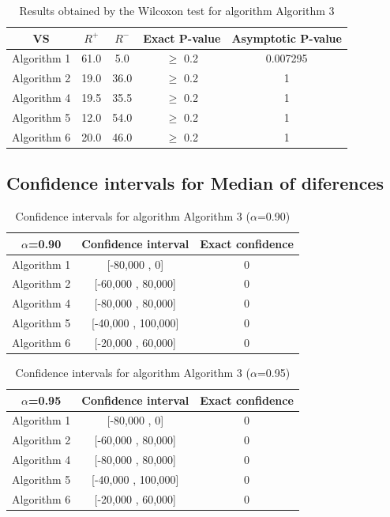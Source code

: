 \documentclass[a4paper,10pt]{article}
\begin{document}
\begin{table}[!htp]
\centering\small
\begin{tabular}{
|c|c|c|c|c|}
\hline
 VS & $R^{+}$ & $R^{-}$ & Exact P-value & Asymptotic P-value \\ \hline 
Algorithm 1 & 61.0 & 5.0 & $\geq$ 0.2 & 0.007295\\ \hline 
Algorithm 2 & 19.0 & 36.0 & $\geq$ 0.2 & 1\\ \hline 
Algorithm 4 & 19.5 & 35.5 & $\geq$ 0.2 & 1\\ \hline 
Algorithm 5 & 12.0 & 54.0 & $\geq$ 0.2 & 1\\ \hline 
Algorithm 6 & 20.0 & 46.0 & $\geq$ 0.2 & 1\\ \hline 

\end{tabular}
\caption{Results obtained by the Wilcoxon test for algorithm Algorithm 3}
\end{table}

\subsection{Confidence intervals for Median of diferences}

\begin{table}[!htp]
\centering\small
\begin{tabular}{
|c|c|c|}
\hline
 $\alpha$=0.90 & Confidence interval & Exact confidence \\ \hline 
Algorithm 1 & [-80,000 , 0] & 0\\ \hline 
Algorithm 2 & [-60,000 , 80,000] & 0\\ \hline 
Algorithm 4 & [-80,000 , 80,000] & 0\\ \hline 
Algorithm 5 & [-40,000 , 100,000] & 0\\ \hline 
Algorithm 6 & [-20,000 , 60,000] & 0\\ \hline 

\end{tabular}
\caption{Confidence intervals for algorithm Algorithm 3 ($\alpha$=0.90)}
\end{table}
\begin{table}[!htp]
\centering\small
\begin{tabular}{
|c|c|c|}
\hline
 $\alpha$=0.95 & Confidence interval & Exact confidence \\ \hline 
Algorithm 1 & [-80,000 , 0] & 0\\ \hline 
Algorithm 2 & [-60,000 , 80,000] & 0\\ \hline 
Algorithm 4 & [-80,000 , 80,000] & 0\\ \hline 
Algorithm 5 & [-40,000 , 100,000] & 0\\ \hline 
Algorithm 6 & [-20,000 , 60,000] & 0\\ \hline 

\end{tabular}
\caption{Confidence intervals for algorithm Algorithm 3 ($\alpha$=0.95)}
\end{table}
\end{document}
